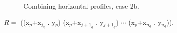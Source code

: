 \begin{figure}
\begin{center}
\end{center}
\caption{\label{fig-profile-horizontal-case-2b}
Combining horizontal profiles, case 2b.}
\end{figure}

$R = $ ((x$_p$$+$x$_{j_q}$ . y$_p$)
(x$_p$$+$x$_{{j+1}_q}$ . y$_{{j+1}_q}$)
$\cdots$ (x$_p$$+$x$_{n_q}$ . y$_{n_q}$)).
